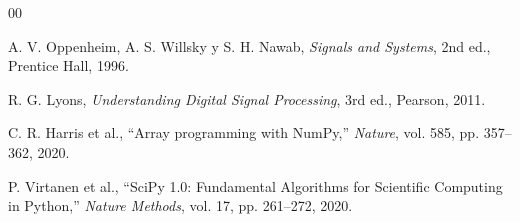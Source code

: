 
\begin{thebibliography}{00}

A. V. Oppenheim, A. S. Willsky y S. H. Nawab,
\textit{Signals and Systems},
2nd ed., Prentice Hall, 1996.

R. G. Lyons,
\textit{Understanding Digital Signal Processing},
3rd ed., Pearson, 2011.

C. R. Harris et al.,
``Array programming with NumPy,''
\textit{Nature}, vol. 585, pp. 357--362, 2020.

P. Virtanen et al.,
``SciPy 1.0: Fundamental Algorithms for Scientific Computing in Python,''
\textit{Nature Methods}, vol. 17, pp. 261--272, 2020.

\end{thebibliography}
